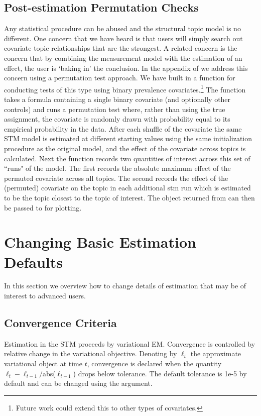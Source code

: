 \documentclass[nojss]{jss}
\begin{document}
\subsection{Post-estimation Permutation Checks}
Any statistical procedure can be abused and the structural topic model is no different. One concern that we have heard is that users will simply search out covariate topic relationships that are the strongest. A related concern is the concern that by combining the measurement model with the estimation of an effect, the user is `baking in' the conclusion. In the appendix of \cite{ajps} we address this concern using a permutation test approach.  We have built in a function for conducting tests of this type using binary prevalence covariates.\footnote{Future work could extend this to other types of covariates.} The  function takes a formula containing a single binary covariate (and optionally other controls) and runs a permutation test where, rather than using the true assignment, the covariate is randomly drawn with probability equal to its empirical probability in the data.
After each shuffle of the covariate the same STM model is estimated at different starting values using the same initialization procedure as the original model, and the effect of the covariate across topics is calculated.
Next the function records two quantities of interest across this set of ``runs" of the model. The first records the absolute maximum effect of the permuted covariate across all topics.
The second records the effect of the (permuted) covariate on the topic in each additional stm run which is estimated to be the topic closest to the topic of interest. The object returned from  can then be passed to  for plotting. 


\section{Changing Basic Estimation Defaults}
In this section we overview how to change details of estimation that may be of interest to advanced users.

\subsection{Convergence Criteria}
Estimation in the STM proceeds by variational EM.  Convergence is controlled by relative change in the variational objective.  Denoting by $\ell_t$ the approximate variational object at time $t$, convergence is declared when the quantity $\ell_t - \ell_{t-1}/$abs($\ell_{t-1}$) drops below tolerance.  The default tolerance is 1e-5 by default and can be changed using the  argument.
\end{document}
